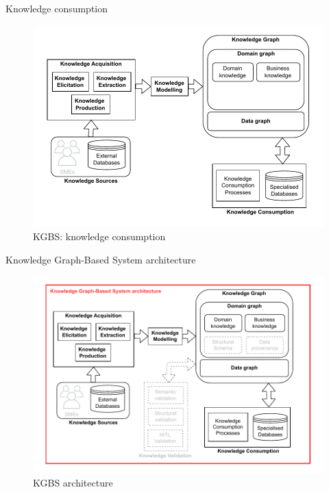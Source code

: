 \begin{frame}{Knowledge consumption}

    \begin{figure} [H]
        \begin{center}
            \includegraphics[scale=0.6]{images/KGBS-knowledge-consumption.pdf} 
            \caption{KGBS: knowledge consumption} 
        \end{center}
    \end{figure}

\end{frame}

\begin{frame}{Knowledge Graph-Based System architecture}

    \begin{figure} [H]
        \begin{center}
            \includegraphics[scale=0.5]{images/KGBS-architecture.pdf} 
            \caption{KGBS architecture} 
        \end{center}
    \end{figure}

\end{frame}

